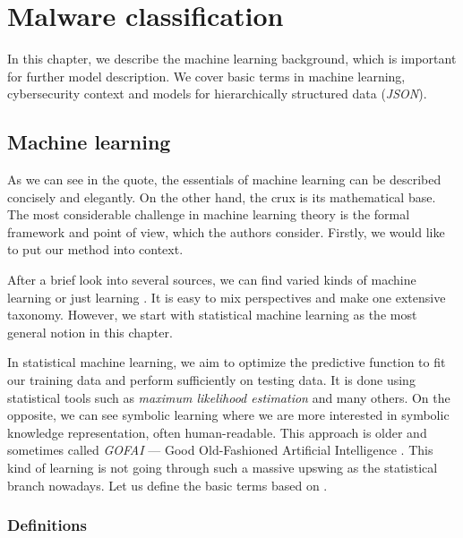 \chapter{Malware classification} \label{chap:classification}
In this chapter, we describe the machine learning background, which is important for further model description. We cover basic terms in machine learning, cybersecurity context and models for hierarchically structured data (\emph{JSON}).

\section{Machine learning}
 \cite{Russell2009}

As we can see in the quote, the essentials of machine learning can be described concisely and elegantly. On the other hand, the crux is its mathematical base. The most considerable challenge in machine learning theory is the formal framework and point of view, which the authors consider. Firstly, we would like to put our method into context.

After a brief look into several sources, we can find varied kinds of machine learning or just learning \cite{Russell2009}. It is easy to mix perspectives and make one extensive taxonomy. However, we start with statistical machine learning as the most general notion in this chapter. 

In statistical machine learning, we aim to optimize the predictive function to fit our training data and perform sufficiently on testing data. It is done using statistical tools such as \emph{maximum likelihood estimation} and many others. On the opposite, we can see symbolic learning where we are more interested in symbolic knowledge representation, often human-readable. This approach is older and sometimes called \emph{GOFAI} --- Good Old-Fashioned Artificial Intelligence \cite{Haugeland1985}. This kind of learning is not going through such a massive upswing as the statistical branch nowadays. Let us define the basic terms based on \cite{Franc2020}.

\subsection{Definitions}
